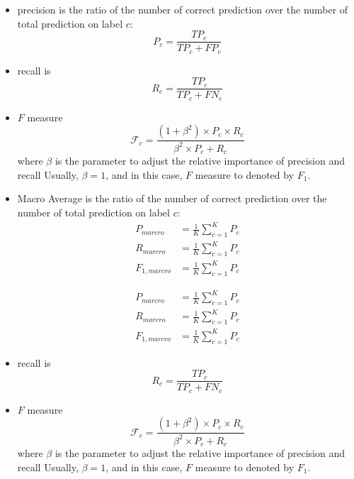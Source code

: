 \begin{refsection}
\begin{definition}[accuracy]
	
\end{definition}


\begin{definition}
	\begin{itemize}
		\item precision is the ratio of the number of correct prediction over the number of total prediction on label $c$: 
		$$P_c =\frac{T P_{c}}{T P_{c}+F P_{c}}$$
		\item recall is 
		$$R_{c}=\frac{T P_{c}}{T P_{c}+F N_{c}}$$
		\item $F$ measure
		$$\mathcal{F}_{c}=\frac{\left(1+\beta^{2}\right) \times P_{c} \times R_{c}}{\beta^{2} \times P_{c}+R_{c}}$$
		where $\beta$ is the parameter to adjust the relative importance of precision and recall
		Usually, $\beta = 1$, and in this case, $F$ measure to denoted by $F_1$.
		
		
		
	\end{itemize}
	
	\begin{itemize}
		\item Macro Average is the ratio of the number of correct prediction over the number of total prediction on label $c$: 
		\begin{align*}
		P_{marcro} &=\frac{1}{K} \sum_{c=1}^K P_c \\
		R_{marcro} &=\frac{1}{K} \sum_{c=1}^K P_c \\
		F_{1,marcro} &=\frac{1}{K} \sum_{c=1}^K P_c 
		\end{align*}
		
		\begin{align*}
		P_{marcro} &=\frac{1}{K} \sum_{c=1}^K P_c \\
		R_{marcro} &=\frac{1}{K} \sum_{c=1}^K P_c \\
		F_{1,marcro} &=\frac{1}{K} \sum_{c=1}^K P_c 
		\end{align*}
		
		
		
		
		\item recall is 
		$$R_{c}=\frac{T P_{c}}{T P_{c}+F N_{c}}$$
		\item $F$ measure
		$$\mathcal{F}_{c}=\frac{\left(1+\beta^{2}\right) \times P_{c} \times R_{c}}{\beta^{2} \times P_{c}+R_{c}}$$
		where $\beta$ is the parameter to adjust the relative importance of precision and recall
		Usually, $\beta = 1$, and in this case, $F$ measure to denoted by $F_1$.
		
		
		
	\end{itemize}
	

\end{definition}
\end{refsection}
